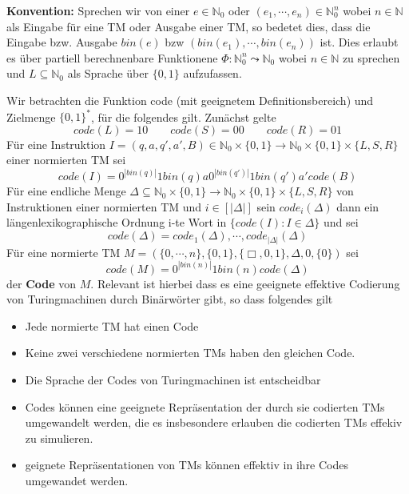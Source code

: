 
\textbf{Konvention: } Sprechen wir von einer $e \in \mathbb{N}_0$ oder $(e_1, \cdots, e_n) \in \mathbb{N}_0^n$ wobei $n \in \mathbb{N}$ als Eingabe für eine TM oder Ausgabe einer TM, so bedetet dies, dass die Eingabe bzw. Ausgabe $bin(e)$ bzw $(bin(e_1), \cdots, bin(e_n))$ ist. Dies erlaubt es über partiell berechnenbare Funktionene $\Phi: \mathbb{N}_0^n \leadsto \mathbb{N}_0$ wobei $n\in \mathbb{N}$ zu sprechen und $L \subseteq \mathbb{N}_0$ als Sprache über $\{0, 1\}$ aufzufassen.

 Wir betrachten die Funktion code (mit geeignetem Definitionsbereich) und Zielmenge $\{0, 1\}^*$, für die folgendes gilt. Zunächst gelte \[code(L) = 10 \qquad code (S) = 00 \qquad code(R) = 01\] Für eine Instruktion $ I = (q, a, q', a', B) \in \mathbb{N}_0 \times \{0, 1\} \to \mathbb{N}_0 \times \{0, 1\} \times \{L, S, R\}$ einer normierten TM sei \[code (I) = 0^{|bin(q)|} 1 bin (q) a 0^{|bin(q')|} 1 bin (q') a' code (B)\] Für eine endliche Menge $ \Delta \subseteq \mathbb{N}_0 \times \{0, 1\} \to \mathbb{N}_0 \times \{0, 1\}\times \{L, S, R\}$ von Instruktionen einer normierten TM und $i \in [|\Delta|]$ sein $code_i(\Delta)$ dann ein längenlexikographische Ordnung i-te Wort in $\{code(I): I \in \Delta\}$ und sei \[ code (\Delta) = code_1(\Delta), \cdots, code_{|\Delta|}(\Delta)\] Für eine normierte TM $M = (\{0, \cdots, n\}, \{0, 1\}, \{\Box, 0, 1\}, \Delta, 0, \{0\})$ sei \[ code (M) = 0^{|bin(n)|} 1 bin (n) code (\Delta)\] der \textbf{Code} von $M$. Relevant ist hierbei dass es eine geeignete effektive Codierung von Turingmachinen durch Binärwörter gibt, so dass folgendes gilt 
\begin{itemize}
  \item Jede normierte TM hat einen Code 
  \item Keine zwei verschiedene normierten TMs haben den gleichen Code.
  \item Die Sprache der Codes von Turingmachinen ist entscheidbar
  \item Codes können eine geeignete Repräsentation der durch sie codierten TMs umgewandelt werden, die es insbesondere erlauben die codierten TMs effekiv zu simulieren.
  \item geignete Repräsentationen von TMs können effektiv in ihre Codes umgewandet werden.
\end{itemize}

